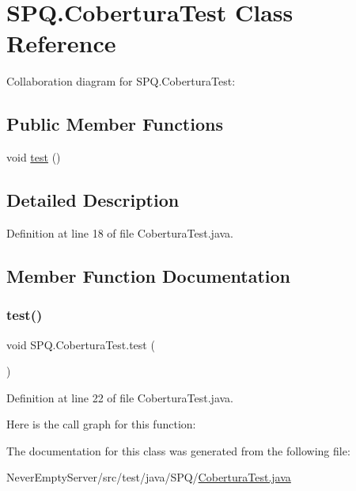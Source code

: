 \hypertarget{class_s_p_q_1_1_cobertura_test}{}\section{S\+P\+Q.\+Cobertura\+Test Class Reference}
\label{class_s_p_q_1_1_cobertura_test}


Collaboration diagram for S\+P\+Q.\+Cobertura\+Test\+:
\subsection*{Public Member Functions}
\begin{DoxyCompactItemize}
\item 
void \mbox{\hyperlink{class_s_p_q_1_1_cobertura_test_a638bd1485fb908cc3a97cda6f4d8a857}{test}} ()
\end{DoxyCompactItemize}


\subsection{Detailed Description}


Definition at line 18 of file Cobertura\+Test.\+java.



\subsection{Member Function Documentation}
\mbox{\label{class_s_p_q_1_1_cobertura_test_a638bd1485fb908cc3a97cda6f4d8a857}} 
\subsubsection{\texorpdfstring{test()}{test()}}
{\footnotesize\ttfamily void S\+P\+Q.\+Cobertura\+Test.\+test (\begin{DoxyParamCaption}{ }\end{DoxyParamCaption})}



Definition at line 22 of file Cobertura\+Test.\+java.

Here is the call graph for this function\+:


The documentation for this class was generated from the following file\+:\begin{DoxyCompactItemize}
\item 
Never\+Empty\+Server/src/test/java/\+S\+P\+Q/\mbox{\hyperlink{_cobertura_test_8java}{Cobertura\+Test.\+java}}\end{DoxyCompactItemize}
